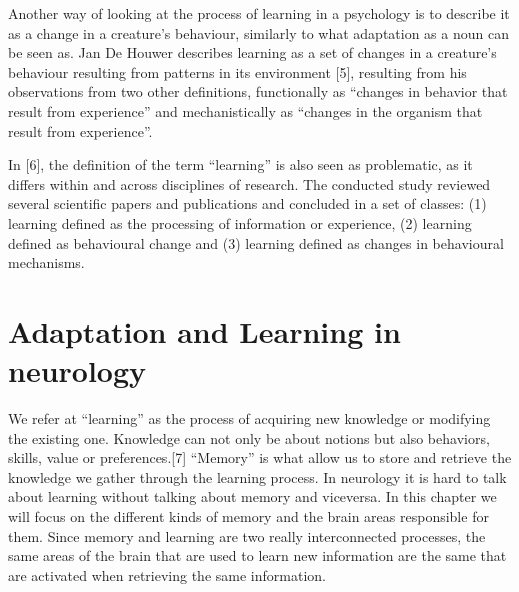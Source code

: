 \documentclass[conference]{IEEEtran}
\begin{document}
	Another way of looking at the process of learning in a psychology is to describe it as a change in a creature’s behaviour, similarly to what adaptation as a noun can be seen as. Jan De Houwer describes learning as a set of changes in a creature’s behaviour resulting from patterns in its environment [5], resulting from his observations from two other definitions, functionally as “changes in behavior that result from experience” and mechanistically as “changes in the organism that result from experience”.

	In [6], the definition of the term “learning” is also seen as problematic, as it differs within and across disciplines of research. The conducted study reviewed several scientific papers and publications and concluded in a set of classes: (1) learning defined as the processing of information or experience, (2) learning defined as behavioural change and (3) learning defined as changes in behavioural mechanisms.

\section{Adaptation and Learning in neurology}
	We refer at ``learning'' as the process of acquiring new knowledge or modifying the existing one. Knowledge can not only be about notions but also behaviors, skills, value or preferences.[7]
	``Memory'' is what allow us to store and retrieve the knowledge we gather through the learning process.
	In neurology it is hard to talk about learning without talking about memory and viceversa. In this chapter we will focus on the different kinds of memory and the brain areas responsible for them.
	Since memory and learning are two really interconnected processes, the same areas of the brain that are used to learn new information are the same that are activated when retrieving the same information.
\end{document}
